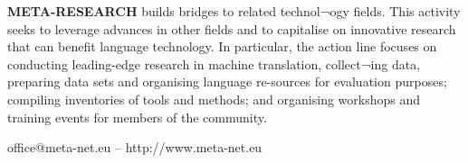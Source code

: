 \begin{multicols}{2}
\textbf{META-RESEARCH} builds bridges to related technol¬ogy ﬁelds. This activity seeks to leverage advances in other ﬁelds and to capitalise on innovative research that can beneﬁt language technology. In particular, the action line focuses on conducting leading-edge research in machine translation, collect¬ing data, preparing data sets and organising language re-sources for evaluation purposes; compiling inventories of tools and methods; and organising workshops and training events for members of the community.
\end{multicols}

\vfill
\centerline{office@meta-net.eu -- http://www.meta-net.eu}

\cleardoublepage

\appendix
{}

%

  
\cleardoublepage

\label{metanetmembers}

\small

